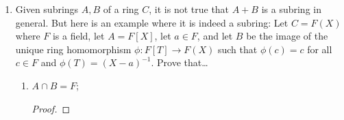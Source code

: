 \documentclass[../psets.tex]{subfiles}
\begin{document}
\begin{enumerate}
\begin{enumerate}
\begin{proof}
        \end{proof}
        \item We have shown that every torsion $R$-module is the direct sum of its $p$-primary components. The $p$-primary component of $K/R$ is $S/R$, where $S$ is an $R$-submodule of $K$. Do you recognize $S$? \emph{Hint}: You encountered it in fourth week.
        \begin{proof}

            Let $p\in R$ be a prime. By definition, the $p$-primary component $S/R$ of the $R$-module $K/R$ is the set of all $a/b+R\in K/R$ such that $p^k(a/b+R)=0+R$ for some $k\in\Zg$. The last expression in the previous sentence is equivalent to $p^ka/b\in R$. But this will be true iff $b\mid p^k$, i.e., if $b=p^\ell$ for some nonnegative integer $\ell\leq k$. Thus, $S/R$ is equivalently the set of all $a/p^\ell+R\in K/R$ for $\ell\in\Zg$. Evidently, this is the image of $R_p$ under the canonical surjection, so
            \begin{equation*}
                \boxed{S = R_p}
            \end{equation*}
        \end{proof}
    \end{enumerate}
    \item Given subrings $A,B$ of a ring $C$, it is not true that $A+B$ is a subring in general. But here is an example where it is indeed a subring: Let $C=F(X)$ where $F$ is a field, let $A=F[X]$, let $a\in F$, and let $B$ be the image of the unique ring homomorphism $\phi:F[T]\to F(X)$ such that $\phi(c)=c$ for all $c\in F$ and $\phi(T)=(X-a)^{-1}$. Prove that\dots
    \begin{enumerate}
        \item $A\cap B=F$;
        \begin{proof}

            



\end{proof}
\end{enumerate}
\end{enumerate}
\end{document}
